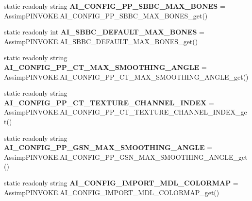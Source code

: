 \begin{DoxyCompactItemize}
\item 
\hypertarget{class_assimp_ac6ffe1ee4dbadd381de6f243fd7691ef}{static readonly string {\bfseries A\+I\+\_\+\+C\+O\+N\+F\+I\+G\+\_\+\+P\+P\+\_\+\+S\+B\+B\+C\+\_\+\+M\+A\+X\+\_\+\+B\+O\+N\+E\+S} = Assimp\+P\+I\+N\+V\+O\+K\+E.\+A\+I\+\_\+\+C\+O\+N\+F\+I\+G\+\_\+\+P\+P\+\_\+\+S\+B\+B\+C\+\_\+\+M\+A\+X\+\_\+\+B\+O\+N\+E\+S\+\_\+get()}\label{class_assimp_ac6ffe1ee4dbadd381de6f243fd7691ef}

\item 
\hypertarget{class_assimp_a67da59baa768b758cc52398374a57adc}{static readonly int {\bfseries A\+I\+\_\+\+S\+B\+B\+C\+\_\+\+D\+E\+F\+A\+U\+L\+T\+\_\+\+M\+A\+X\+\_\+\+B\+O\+N\+E\+S} = Assimp\+P\+I\+N\+V\+O\+K\+E.\+A\+I\+\_\+\+S\+B\+B\+C\+\_\+\+D\+E\+F\+A\+U\+L\+T\+\_\+\+M\+A\+X\+\_\+\+B\+O\+N\+E\+S\+\_\+get()}\label{class_assimp_a67da59baa768b758cc52398374a57adc}

\item 
\hypertarget{class_assimp_a8df132c8490a6ada15129b8690742e00}{static readonly string {\bfseries A\+I\+\_\+\+C\+O\+N\+F\+I\+G\+\_\+\+P\+P\+\_\+\+C\+T\+\_\+\+M\+A\+X\+\_\+\+S\+M\+O\+O\+T\+H\+I\+N\+G\+\_\+\+A\+N\+G\+L\+E} = Assimp\+P\+I\+N\+V\+O\+K\+E.\+A\+I\+\_\+\+C\+O\+N\+F\+I\+G\+\_\+\+P\+P\+\_\+\+C\+T\+\_\+\+M\+A\+X\+\_\+\+S\+M\+O\+O\+T\+H\+I\+N\+G\+\_\+\+A\+N\+G\+L\+E\+\_\+get()}\label{class_assimp_a8df132c8490a6ada15129b8690742e00}

\item 
\hypertarget{class_assimp_a7779ba5cbb9aa54e45f3e1cceed035e4}{static readonly string {\bfseries A\+I\+\_\+\+C\+O\+N\+F\+I\+G\+\_\+\+P\+P\+\_\+\+C\+T\+\_\+\+T\+E\+X\+T\+U\+R\+E\+\_\+\+C\+H\+A\+N\+N\+E\+L\+\_\+\+I\+N\+D\+E\+X} = Assimp\+P\+I\+N\+V\+O\+K\+E.\+A\+I\+\_\+\+C\+O\+N\+F\+I\+G\+\_\+\+P\+P\+\_\+\+C\+T\+\_\+\+T\+E\+X\+T\+U\+R\+E\+\_\+\+C\+H\+A\+N\+N\+E\+L\+\_\+\+I\+N\+D\+E\+X\+\_\+get()}\label{class_assimp_a7779ba5cbb9aa54e45f3e1cceed035e4}

\item 
\hypertarget{class_assimp_a09c5b30d51c8be914fdf972c8807de6f}{static readonly string {\bfseries A\+I\+\_\+\+C\+O\+N\+F\+I\+G\+\_\+\+P\+P\+\_\+\+G\+S\+N\+\_\+\+M\+A\+X\+\_\+\+S\+M\+O\+O\+T\+H\+I\+N\+G\+\_\+\+A\+N\+G\+L\+E} = Assimp\+P\+I\+N\+V\+O\+K\+E.\+A\+I\+\_\+\+C\+O\+N\+F\+I\+G\+\_\+\+P\+P\+\_\+\+G\+S\+N\+\_\+\+M\+A\+X\+\_\+\+S\+M\+O\+O\+T\+H\+I\+N\+G\+\_\+\+A\+N\+G\+L\+E\+\_\+get()}\label{class_assimp_a09c5b30d51c8be914fdf972c8807de6f}

\item 
\hypertarget{class_assimp_a703211c11708ed8cee3f714aa8fdb964}{static readonly string {\bfseries A\+I\+\_\+\+C\+O\+N\+F\+I\+G\+\_\+\+I\+M\+P\+O\+R\+T\+\_\+\+M\+D\+L\+\_\+\+C\+O\+L\+O\+R\+M\+A\+P} = Assimp\+P\+I\+N\+V\+O\+K\+E.\+A\+I\+\_\+\+C\+O\+N\+F\+I\+G\+\_\+\+I\+M\+P\+O\+R\+T\+\_\+\+M\+D\+L\+\_\+\+C\+O\+L\+O\+R\+M\+A\+P\+\_\+get()}\label{class_assimp_a703211c11708ed8cee3f714aa8fdb964}


\end{DoxyCompactItemize}
